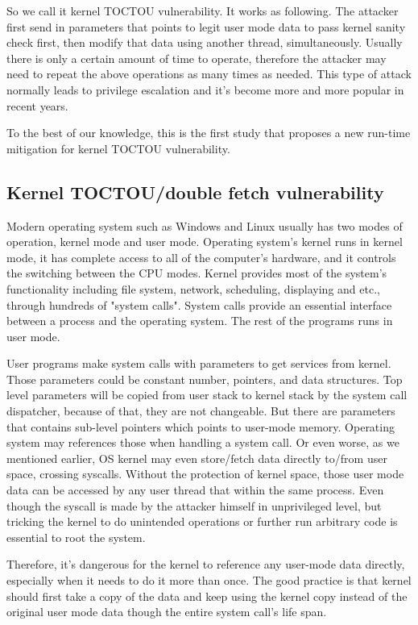 So we call it kernel TOCTOU vulnerability. It works as following. The attacker first send in parameters that points to legit user mode data to pass kernel sanity check first, then modify that data using another thread, simultaneously. Usually there is only a certain amount of time to operate, therefore the attacker may need to repeat the above operations as many times as needed. This type of attack normally leads to privilege escalation and it's become more and more popular in recent years.


To the best of our knowledge, this is the first study that proposes a new run-time mitigation for kernel TOCTOU vulnerability. 

\subsection{Kernel TOCTOU/double fetch vulnerability}

Modern operating system such as Windows and Linux usually has two modes of operation, kernel mode and user mode. Operating system's kernel runs in kernel mode, it has complete access to all of the computer's hardware, and it controls the switching between the CPU modes. Kernel provides most of the system's functionality including file system, network, scheduling, displaying and etc., through hundreds of "system calls". System calls provide an essential interface between a process and the operating system. The rest of the programs runs in user mode. 

User programs make system calls with parameters to get services from kernel. Those parameters could be constant number, pointers, and data structures. Top level parameters will be copied from user stack to kernel stack by the system call dispatcher, because of that, they are not changeable. But there are parameters that contains sub-level pointers which points to user-mode memory. Operating system may references those when handling a system call. Or even worse, as we mentioned earlier, OS kernel may even store/fetch data directly to/from user space, crossing syscalls. Without the protection of kernel space, those user mode data can be accessed by any user thread that within the same process. Even though the syscall is made by the attacker himself in unprivileged level, but tricking the kernel to do unintended operations or further run arbitrary code is essential to root the system.     

Therefore, it's dangerous for the kernel to reference any user-mode data directly, especially when it needs to do it more than once. The good practice is that kernel should first take a copy of the data and keep using the kernel copy instead of the original user mode data though the entire system call's life span.

